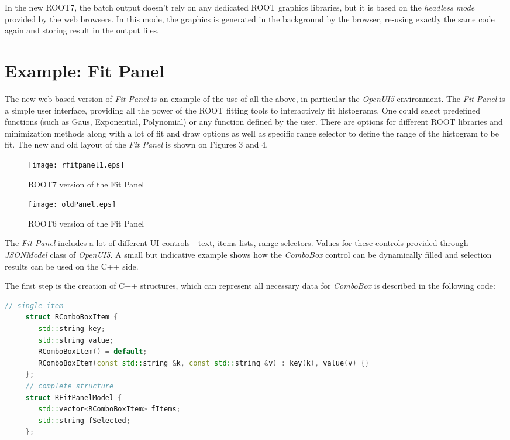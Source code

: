 \documentclass[a4paper]{jpconf}
\begin{document}
In the new ROOT7, the batch output doesn't rely on any dedicated ROOT graphics
libraries, but it is based on the \textit{headless mode} provided by the web
browsers. In this mode, the graphics is generated in the background by the browser, re-using exactly the same code again and storing result in the output files.

\section{Example: Fit Panel}

The new web-based version of \textit{Fit Panel} is an example of the use of all the above,
in particular the \textit{OpenUI5} environment.
The \href{https://root.cern/fit-panel}{\textit{Fit Panel}} is a simple user interface, providing all the
power of the ROOT fitting tools to interactively fit histograms. One could select predefined
functions (such as Gaus, Exponential, Polynomial) or any function defined by
the user. There are options for different ROOT libraries and minimization methods
along with a lot of fit and draw options as well as specific range selector to define the range of the
histogram to be fit. The new and old layout of the \textit{Fit Panel} is shown on Figures 3 and 4.

\begin{figure}[h]
  \centering
\begin{minipage}{14pc}
\texttt{[image: rfitpanel1.eps]}
\caption{\label{label}ROOT7 version of the Fit Panel}
\end{minipage}\hspace{2pc}%
\begin{minipage}{14pc}
\texttt{[image: oldPanel.eps]}
\caption{\label{label}ROOT6 version of the Fit Panel}
\end{minipage}
\end{figure}

The \textit{Fit Panel} includes a lot of different UI controls - text, items lists, range selectors.
Values for these controls provided through \textit{JSONModel} class of \textit{OpenUI5}.
A small but indicative example shows how the \textit{ComboBox} control can be dynamically filled and selection results can be used on the C++ side.

The first step is the creation of C++ structures, which can represent all necessary data for \textit{ComboBox} is described in the following code:

\begin{lstlisting}[language=C++,numbers=none]
     // single item
     struct RComboBoxItem {
        std::string key;
        std::string value;
        RComboBoxItem() = default;
        RComboBoxItem(const std::string &k, const std::string &v) : key(k), value(v) {}
     };
     // complete structure
     struct RFitPanelModel {
        std::vector<RComboBoxItem> fItems;
        std::string fSelected;
     };
\end{lstlisting}
\end{document}
